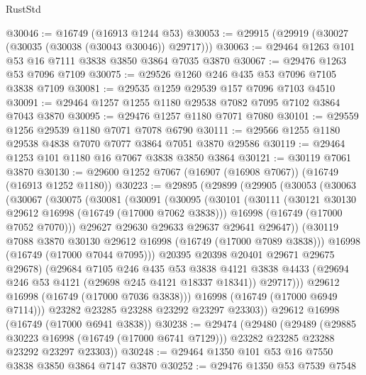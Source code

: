 \begin{lexlean}{RustStd}
\begin{coremodule}
@30046 := @16749 (@16913 @1244 @53)
@30053 := @29915 (@29919 (@30027 (@30035 (@30038 (@30043 @30046)) @29717)))
@30063 := @29464 @1263 @101 @53 @16 @7111 @3838 @3850 @3864 @7035 @3870
@30067 := @29476 @1263 @53 @7096 @7109
@30075 := @29526 @1260 @246 @435 @53 @7096 @7105 @3838 @7109
@30081 := @29535 @1259 @29539 @157 @7096 @7103 @4510
@30091 := @29464 @1257 @1255 @1180 @29538 @7082 @7095 @7102 @3864 @7043 @3870
@30095 := @29476 @1257 @1180 @7071 @7080
@30101 := @29559 @1256 @29539 @1180 @7071 @7078 @6790
@30111 := @29566 @1255 @1180 @29538 @4838 @7070 @7077 @3864 @7051 @3870 @29586
@30119 := @29464 @1253 @101 @1180 @16 @7067 @3838 @3850 @3864
@30121 := @30119 @7061 @3870
@30130 := @29600 @1252 @7067 (@16907 (@16908 @7067)) (@16749 (@16913 @1252 @1180))
@30223 := @29895
    (@29899
      (@29905
        (@30053
          (@30063
            (@30067
              (@30075
                (@30081
                  (@30091
                    (@30095
                      (@30101
                        (@30111
                          (@30121 @30130 @29612 @16998 (@16749 (@17000 @7062 @3838)))
                          @16998
                          (@16749 (@17000 @7052 @7070)))
                        @29627
                        @29630
                        @29633
                        @29637
                        @29641
                        @29647))
                    (@30119 @7088 @3870 @30130 @29612 @16998 (@16749 (@17000 @7089 @3838)))
                    @16998
                    (@16749 (@17000 @7044 @7095)))
                  @20395
                  @20398
                  @20401
                  @29671
                  @29675
                  @29678)
                (@29684
                  @7105
                  @246
                  @435
                  @53
                  @3838
                  @4121
                  @3838
                  @4433
                  (@29694 @246 @53 @4121 (@29698 @245 @4121 @18337 @18341))
                  @29717)))
            @29612
            @16998
            (@16749 (@17000 @7036 @3838)))
          @16998
          (@16749 (@17000 @6949 @7114)))
        @23282
        @23285
        @23288
        @23292
        @23297
        @23303))
    @29612
    @16998
    (@16749 (@17000 @6941 @3838))
@30238 := @29474
    (@29480
      (@29489
        (@29885 @30223 @16998 (@16749 (@17000 @6741 @7129)))
        @23282
        @23285
        @23288
        @23292
        @23297
        @23303))
@30248 := @29464 @1350 @101 @53 @16 @7550 @3838 @3850 @3864 @7147 @3870
@30252 := @29476 @1350 @53 @7539 @7548

\end{coremodule}
\end{lexlean}
